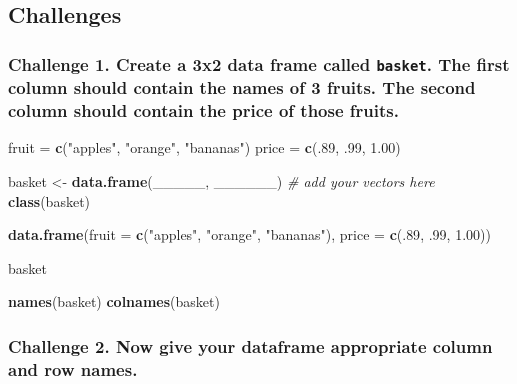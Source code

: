 \documentclass[]{book}
\newenvironment{Shaded}{\begin{snugshade}}{\end{snugshade}}
\newcommand{\KeywordTok}[1]{\textcolor[rgb]{0.13,0.29,0.53}{\textbf{#1}}}
\newcommand{\DataTypeTok}[1]{\textcolor[rgb]{0.13,0.29,0.53}{#1}}
\newcommand{\DecValTok}[1]{\textcolor[rgb]{0.00,0.00,0.81}{#1}}
\newcommand{\FloatTok}[1]{\textcolor[rgb]{0.00,0.00,0.81}{#1}}
\newcommand{\StringTok}[1]{\textcolor[rgb]{0.31,0.60,0.02}{#1}}
\newcommand{\CommentTok}[1]{\textcolor[rgb]{0.56,0.35,0.01}{\textit{#1}}}
\newcommand{\NormalTok}[1]{#1}
\begin{document}
\subsection{Challenges}\label{challenges-8}

\subsubsection*{\texorpdfstring{Challenge 1. Create a 3x2 data frame
called \texttt{basket}. The first column should contain the names of 3
fruits. The second column should contain the price of those
fruits.}{Challenge 1. Create a 3x2 data frame called basket. The first column should contain the names of 3 fruits. The second column should contain the price of those fruits.}}\label{challenge-1.-create-a-3x2-data-frame-called-basket.-the-first-column-should-contain-the-names-of-3-fruits.-the-second-column-should-contain-the-price-of-those-fruits.}

\begin{Shaded}
\begin{Highlighting}[]

\NormalTok{fruit =}\StringTok{ }\KeywordTok{c}\NormalTok{(}\StringTok{"apples"}\NormalTok{, }\StringTok{"orange"}\NormalTok{, }\StringTok{"bananas"}\NormalTok{)}
\NormalTok{price =}\StringTok{ }\KeywordTok{c}\NormalTok{(.}\DecValTok{89}\NormalTok{, .}\DecValTok{99}\NormalTok{, }\FloatTok{1.00}\NormalTok{)}

\NormalTok{basket <-}\StringTok{ }\KeywordTok{data.frame}\NormalTok{(_____, ______) }\CommentTok{# add your vectors here}
\KeywordTok{class}\NormalTok{(basket)}

\KeywordTok{data.frame}\NormalTok{(}\DataTypeTok{fruit =} \KeywordTok{c}\NormalTok{(}\StringTok{"apples"}\NormalTok{, }\StringTok{"orange"}\NormalTok{, }\StringTok{"bananas"}\NormalTok{), }\DataTypeTok{price =} \KeywordTok{c}\NormalTok{(.}\DecValTok{89}\NormalTok{, .}\DecValTok{99}\NormalTok{, }\FloatTok{1.00}\NormalTok{))}

\NormalTok{basket}

\KeywordTok{names}\NormalTok{(basket)}
\KeywordTok{colnames}\NormalTok{(basket)}
\end{Highlighting}
\end{Shaded}

\subsubsection*{Challenge 2. Now give your dataframe appropriate column
and row
names.}\label{challenge-2.-now-give-your-dataframe-appropriate-column-and-row-names.}
\end{document}
